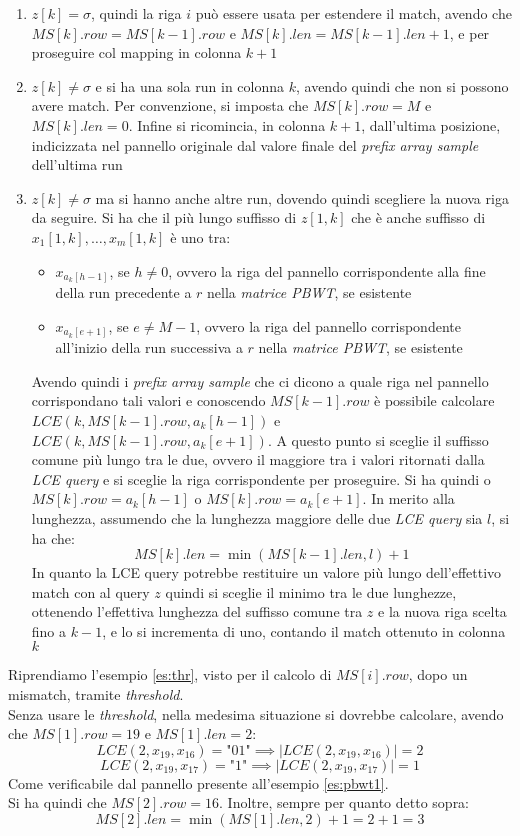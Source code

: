 \begin{enumerate}
  \item $z[k]=\sigma$, quindi la riga $i$ può essere usata per estendere il
  match, avendo che $MS[k].row=MS[k-1].row$ e $MS[k].len=MS[k-1].len+1$, e per
  proseguire col mapping in colonna $k+1$
  \item $z[k]\neq\sigma$ e si ha una sola run in colonna $k$, avendo quindi che
  non si possono avere match. Per convenzione, si
  imposta che $MS[k].row = M$ e $MS[k].len=0$. Infine si ricomincia, in colonna
  $k+1$, dall'ultima posizione, indicizzata nel pannello originale dal valore
  finale del \textit{prefix array sample} dell'ultima run
  \item $z[k]\neq\sigma$ ma si hanno anche altre run, dovendo quindi scegliere
  la nuova riga da seguire. Si ha che il più lungo suffisso di $z[1,k]$ che è
  anche suffisso di $x_1[1,k],\ldots, x_m[1,k]$ è uno tra:
  \begin{itemize}
    \item $x_{a_k[h-1]}$, se $h\neq 0$, ovvero la riga del pannello
    corrispondente alla fine della run precedente a $r$ nella \textit{matrice
      PBWT}, se esistente
    \item $x_{a_k[e+1]}$, se $e\neq M-1$, ovvero la riga del pannello
    corrispondente all'inizio della run successiva a $r$ nella \textit{matrice
      PBWT}, se esistente
  \end{itemize}
  Avendo quindi i \textit{prefix array sample} che ci dicono a quale riga nel
  pannello corrispondano tali valori e conoscendo $MS[k-1].row$ è possibile
  calcolare $LCE(k,MS[k-1].row, a_k[h-1])$ e $LCE(k,MS[k-1].row, a_k[e+1])$. A
  questo punto si sceglie il suffisso comune più lungo tra le due, ovvero il
  maggiore tra i valori ritornati dalla \textit{LCE query} e si sceglie la riga
  corrispondente per proseguire. Si ha quindi o $MS[k].row=a_k[h-1]$ o
  $MS[k].row=a_k[e+1]$. In merito alla lunghezza, assumendo che la lunghezza
  maggiore delle due \textit{LCE query} sia $l$, si ha che:
  \[MS[k].len=\min(MS[k-1].len, l)+1\]
  In quanto la LCE query potrebbe restituire un valore più lungo dell'effettivo
  match con al query $z$ quindi si sceglie il minimo tra le due lunghezze,
  ottenendo l'effettiva lunghezza del suffisso comune tra $z$ e la nuova riga
  scelta fino a $k-1$, e lo si 
  incrementa di uno, contando il match ottenuto in colonna $k$
\end{enumerate}
\begin{esempio}
  Riprendiamo l'esempio \ref{es:thr}, visto per il calcolo di $MS[i].row$, dopo
  un mismatch,
  tramite \textit{threshold}. \\
  Senza usare le \textit{threshold}, nella medesima situazione si dovrebbe
  calcolare, avendo che $MS[1].row=19$ e $MS[1].len =2$:
  \[LCE(2, x_{19}, x_{16}) = \mbox{"01"} \implies|LCE(2, x_{19}, x_{16})|=2\]
  \[LCE(2, x_{19}, x_{17}) = \mbox{"1"} \implies|LCE(2, x_{19}, x_{17})|=1\]
  Come verificabile dal pannello presente all'esempio \ref{es:pbwt1}.\\
  Si ha quindi che $MS[2].row=16$. Inoltre, sempre per quanto detto sopra:
  \[MS[2].len=\min(MS[1].len, 2)+1=2+1=3\]
\end{esempio}

